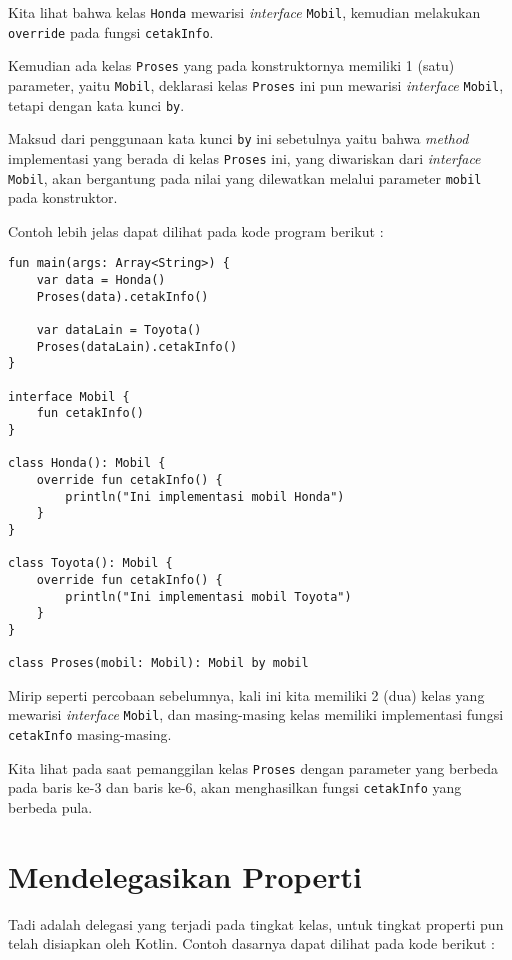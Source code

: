 Kita lihat bahwa kelas \texttt{Honda} mewarisi \textit{interface} \texttt{Mobil}, kemudian melakukan \texttt{override} pada fungsi \texttt{cetakInfo}.

Kemudian ada kelas \texttt{Proses} yang pada konstruktornya memiliki 1 (satu) parameter, yaitu \texttt{Mobil}, deklarasi kelas \texttt{Proses} ini pun mewarisi \textit{interface} \texttt{Mobil}, tetapi dengan kata kunci \texttt{by}. 

Maksud dari penggunaan kata kunci \texttt{by} ini sebetulnya yaitu bahwa \textit{method} implementasi yang berada di kelas \texttt{Proses} ini, yang diwariskan dari \textit{interface} \texttt{Mobil}, akan bergantung pada nilai yang dilewatkan melalui parameter \texttt{mobil} pada konstruktor.

Contoh lebih jelas dapat dilihat pada kode program berikut :

\begin{lstlisting}
fun main(args: Array<String>) {
	var data = Honda()
	Proses(data).cetakInfo()
	
	var dataLain = Toyota()
	Proses(dataLain).cetakInfo()
}

interface Mobil {
	fun cetakInfo()
}

class Honda(): Mobil {
	override fun cetakInfo() {
		println("Ini implementasi mobil Honda")
	}
}

class Toyota(): Mobil {
	override fun cetakInfo() {
		println("Ini implementasi mobil Toyota")
	}
}

class Proses(mobil: Mobil): Mobil by mobil
\end{lstlisting}

Mirip seperti percobaan sebelumnya, kali ini kita memiliki 2 (dua) kelas yang mewarisi \textit{interface} \texttt{Mobil}, dan masing-masing kelas memiliki implementasi fungsi \texttt{cetakInfo} masing-masing.

Kita lihat pada saat pemanggilan kelas \texttt{Proses} dengan parameter yang berbeda pada baris ke-3 dan baris ke-6, akan menghasilkan fungsi \texttt{cetakInfo} yang berbeda pula.

\section{Mendelegasikan Properti}

Tadi adalah delegasi yang terjadi pada tingkat kelas, untuk tingkat properti pun telah disiapkan oleh Kotlin. Contoh dasarnya dapat dilihat pada kode berikut :

